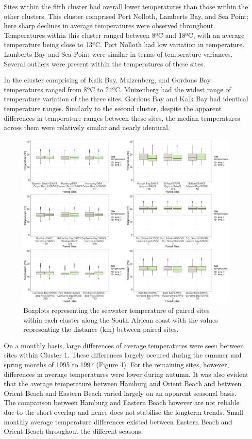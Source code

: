 \documentclass[12pt,a4paper,]{article}
\begin{document}
Sites within the fifth cluster had overall lower temperatures than those
within the other clusters. This cluster comprised Port Nolloth, Lamberts
Bay, and Sea Point; here sharp declines in average temperatures were
observed throughout. Temperatures within this cluster ranged between 8ºC
and 18ºC, with an average temperature being close to 13ºC. Port Nolloth
had low variation in temperature. Lamberts Bay and Sea Point were
similar in terms of temperature variances. Several outliers were present
within the temperatures of these sites.

In the cluster comprising of Kalk Bay, Muizenberg, and Gordons Bay
temperatures ranged from 8ºC to 24ºC. Muizenberg had the widest range of
temperature variation of the three sites. Gordons Bay and Kalk Bay had
identical temperature ranges. Similarly to the second cluster, despite
the apparent differences in temperature ranges between these sites, the
median temperatures across them were relatively similar and nearly
identical.

\begin{figure}
\centering
\includegraphics{../figures/combined_plot.pdf}
\caption{Boxplots representing the seawater temperature of paired sites
within each cluster along the South African coast with the values
representing the distance (km) between paired sites.}
\end{figure}

On a monthly basis, large differences of average temperatures were seen
between sites within Cluster 1. These differences largely occured during
the summer and spring months of 1995 to 1997 (Figure 4). For the
remaining sites, however, differences in average temperatures were lower
during autumn. It was also evident that the average temperature between
Hamburg and Orient Beach and between Orient Beach and Eastern Beach
varied largely on an apparent seasonal basis. The comparison between
Hamburg and Eastern Beach however are not reliable due to the short
overlap and hence does not stabilise the longterm trends. Small monthly
average temperature differences existed between Eastern Beach and Orient
Beach throughout the different seasons.
\end{document}
